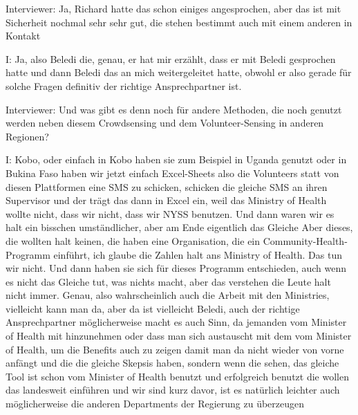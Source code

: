 Interviewer: Ja, Richard hatte das schon einiges angesprochen, aber das ist mit Sicherheit nochmal sehr sehr gut, die stehen bestimmt auch mit einem anderen in Kontakt 

I: Ja, also Beledi die, genau, er hat mir erzählt, dass er mit Beledi gesprochen hatte und dann Beledi das an mich weitergeleitet hatte, obwohl er also gerade für solche Fragen definitiv der richtige Ansprechpartner ist.

Interviewer: Und was gibt es denn noch für andere Methoden, die noch genutzt werden neben diesem Crowdsensing und dem Volunteer-Sensing in anderen Regionen? 

I: Kobo, oder einfach in Kobo haben sie zum Beispiel in Uganda genutzt oder in Bukina Faso haben wir jetzt einfach Excel-Sheets also die Volunteers statt von diesen Plattformen eine SMS zu schicken, schicken die gleiche SMS an ihren Supervisor und der trägt das dann in Excel ein, weil das Ministry of Health wollte nicht, dass wir nicht, dass wir NYSS benutzen. Und dann waren wir es halt ein bisschen umständlicher, aber am Ende eigentlich das Gleiche Aber dieses, die wollten halt keinen, die haben eine Organisation, die ein Community-Health-Programm einführt, ich glaube die Zahlen halt ans Ministry of Health. Das tun wir nicht. Und dann haben sie sich für dieses Programm entschieden, auch wenn es nicht das Gleiche tut, was nichts macht, aber das verstehen die Leute halt nicht immer. Genau, also wahrscheinlich auch die Arbeit mit den Ministries, vielleicht kann man da, aber da ist vielleicht Beledi, auch der richtige Ansprechpartner möglicherweise macht es auch Sinn, da jemanden vom Minister of Health mit hinzunehmen oder dass man sich austauscht mit dem vom Minister of Health, um die Benefits auch zu zeigen damit man da nicht wieder von vorne anfängt und die die gleiche Skepsis haben, sondern wenn die sehen, das gleiche Tool ist schon vom Minister of Health benutzt und erfolgreich benutzt die wollen das landesweit einführen und wir sind kurz davor, ist es natürlich leichter auch möglicherweise die anderen Departments der Regierung zu überzeugen 

